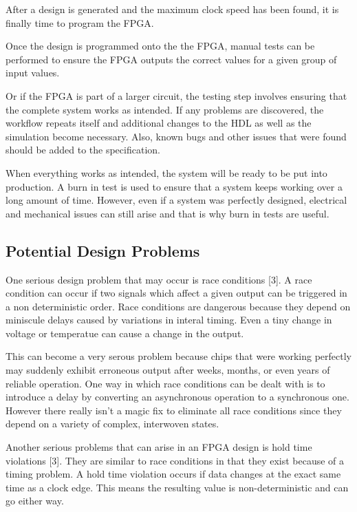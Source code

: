 \documentclass{article}
\begin{document}
    After a design is generated and the maximum clock speed has been found,
    it is finally time to program the FPGA.

    Once the design is programmed onto the the FPGA, manual tests can be performed
    to ensure the FPGA outputs the correct values for a given group of input values.

    Or if the FPGA is part of a larger circuit, the testing step involves ensuring
    that the complete system works as intended. If any problems are discovered,
    the workflow repeats itself and additional changes to the HDL as well as
    the simulation become necessary. Also, known bugs and other issues that were found
    should be added to the specification.

    When everything works as intended, the system will be ready to be put into production.
    A burn in test is used to ensure that a system keeps working over a long amount of time.
    However, even if a system was perfectly designed, electrical and mechanical issues
    can still arise and that is why burn in tests are useful.

    \subsection{Potential Design Problems}

    One serious design problem that may occur is race conditions [3].
    A race condition can occur if two signals which affect a given output
    can be triggered in a non deterministic order. Race conditions are dangerous
    because they depend on miniscule delays caused by variations in interal timing.
    Even a tiny change in voltage or temperatue can cause a change in the output.

    This can become a very serous problem because chips that were working perfectly
    may suddenly exhibit erroneous output after weeks, months, or even years of
    reliable operation. One way in which race conditions can be dealt with
    is to introduce a delay by converting an asynchronous operation to a synchronous one.
    However there really isn't a magic fix to eliminate all race conditions since
    they depend on a variety of complex, interwoven states.

    Another serious problems that can arise in an FPGA design is hold time violations [3].
    They are similar to race conditions in that they exist because of a timing problem.
    A hold time violation occurs if data changes at the exact same time as a clock edge.
    This means the resulting value is non-deterministic and can go either way.
\end{document}
